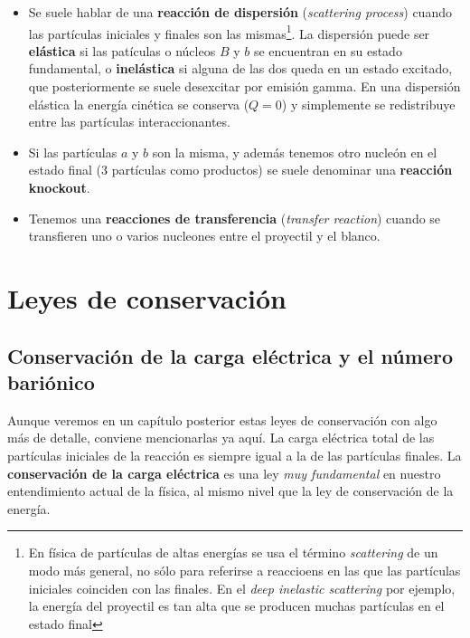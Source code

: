 \begin{itemize}
    \item Se suele hablar de una \textbf{reacción de dispersión} (\textit{scattering process}) cuando las partículas iniciales y finales son las mismas\footnote{En física de partículas de altas energías se usa el término \textit{scattering} de un modo más general, no sólo para referirse a reaccioens en las que las partículas iniciales coinciden con las finales. En el \textit{deep inelastic scattering} por ejemplo, la energía del proyectil es tan alta que se producen muchas partículas en el estado final}. La dispersión puede ser \textbf{elástica} si las patículas o núcleos $B$ y $b$ se encuentran en su estado fundamental, o \textbf{inelástica} si alguna de las dos queda en un estado excitado, que posteriormente se suele desexcitar por emisión gamma. En una dispersión elástica la energía cinética se conserva ($Q=0$) y simplemente se redistribuye entre las partículas interaccionantes.
    \item Si las partículas $a$ y $b$ son la misma, y además tenemos otro nucleón en el estado final (3 partículas como productos) se suele denominar una \textbf{reacción knockout}.
    \item Tenemos una \textbf{reacciones de transferencia} (\textit{transfer reaction}) cuando se transfieren uno o varios nucleones entre el proyectil y el blanco.
\end{itemize}



\section{Leyes de conservación}

\subsection{Conservación de la carga eléctrica y el número bariónico}

Aunque veremos en un capítulo posterior estas leyes de conservación con algo más de detalle, conviene mencionarlas ya aquí. La carga eléctrica total de las partículas iniciales de la reacción es siempre igual a la de las partículas finales. La \textbf{conservación de la carga eléctrica} es una ley \textit{muy fundamental} en nuestro entendimiento actual de la física, al mismo nivel que la ley de conservación de la energía.



